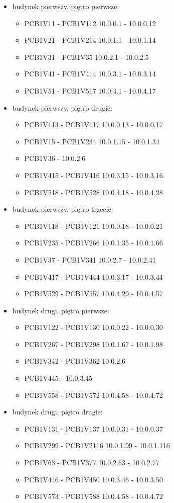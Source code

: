 \documentclass[a4paper, 12pt]{article}
\begin{document}
\begin{itemize}
\item budynek pierwszy, piętro pierwsze:
	\begin{itemize}
	\item PCB1V11 - PCB1V112 10.0.0.1 - 10.0.0.12
	\item PCB1V21 - PCB1V214 10.0.1.1 - 10.0.1.14
	\item PCB1V31 - PCB1V35 10.0.2.1 - 10.0.2.5
	\item PCB1V41 - PCB1V414 10.0.3.1 - 10.0.3.14
	\item PCB1V51 - PCB1V517 10.0.4.1 - 10.0.4.17
	\end{itemize}
\item budynek pierwszy, piętro drugie:
	\begin{itemize}
	\item PCB1V113 - PCB1V117 10.0.0.13 - 10.0.0.17
	\item PCB1V15 - PCB1V234 10.0.1.15 - 10.0.1.34
	\item PCB1V36 - 10.0.2.6
	\item PCB1V415 - PCB1V416 10.0.3.15 - 10.0.3.16
	\item PCB1V518 - PCB1V528 10.0.4.18 - 10.0.4.28
	\end{itemize}
\item budynek pierwszy, piętro trzecie:
	\begin{itemize}
	\item PCB1V118 - PCB1V121 10.0.0.18 - 10.0.0.21
	\item PCB1V235 - PCB1V266 10.0.1.35 - 10.0.1.66
	\item PCB1V37 - PCB1V341 10.0.2.7 - 10.0.2.41
	\item PCB1V417 - PCB1V444 10.0.3.17 - 10.0.3.44
	\item PCB1V529 - PCB1V557 10.0.4.29 - 10.0.4.57
	\end{itemize}
\item budynek drugi, piętro pierwsze:
	\begin{itemize}
	\item PCB1V122 - PCB1V130 10.0.0.22 - 10.0.0.30
	\item PCB1V267 - PCB1V298 10.0.1.67 - 10.0.1.98
	\item PCB1V342 - PCB1V362 10.0.2.6
	\item PCB1V445 - 10.0.3.45
	\item PCB1V558 - PCB1V572 10.0.4.58 - 10.0.4.72
	\end{itemize}
\item budynek drugi, piętro drugie:
	\begin{itemize}
	\item PCB1V131 - PCB1V137 10.0.0.31 - 10.0.0.37
	\item PCB1V299 - PCB1V2116 10.0.1.99 - 10.0.1.116
	\item PCB1V63 - PCB1V377 10.0.2.63 - 10.0.2.77
	\item PCB1V446 - PCB1V450 10.0.3.46 - 10.0.3.50
	\item PCB1V573 - PCB1V588 10.0.4.58 - 10.0.4.72
	\end{itemize}
\end{itemize}
\end{document}
